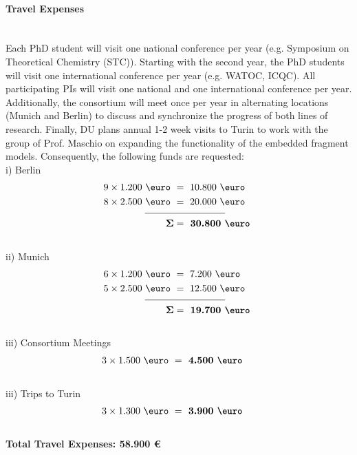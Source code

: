\documentclass[a4paper,11pt,headings=normal]{scrartcl}
\begin{document}
\begin{itemize}
\paragraph{Travel Expenses}\ \\
Each PhD student will visit one national conference per year (e.g. Symposium on 
Theoretical Chemistry (STC)). Starting with the second year, the PhD students 
will visit one international conference per year (e.g. WATOC, ICQC). 
All participating PIs will visit one national and one international conference per year.
Additionally, the consortium will meet once per year in alternating locations 
(Munich and Berlin) to discuss and synchronize the progress of both lines of 
research. Finally, DU plans annual 1-2 week visits to Turin to work with the group of Prof. Maschio on expanding the functionality of the embedded fragment models. Consequently, the following funds are requested:\\
i) Berlin
\begin{align*}
	\text{9} \times \text{1.200 \euro } &= \text{ 10.800 \euro 
	}\\
	\text{8} \times  \text{2.500 \euro } &= \text{ 20.000 \euro 
	}\\[-0.75em]
	\underline{\quad\qquad}&\underline{\qquad \qquad \quad\ }\\
	\mathbf{\Sigma} &= \textbf{ 30.800 \euro }
\end{align*}
\ \\
ii) Munich
\begin{align*}
	\text{6} \times \text{1.200 \euro } &= \text{ 7.200 \euro 
	}\\
	\text{5} \times  \text{2.500 \euro } &= \text{ 12.500 \euro 
	}\\[-0.75em]
	\underline{\quad\qquad}&\underline{\qquad \qquad \quad\ }\\
	\mathbf{\Sigma} &= \textbf{ 19.700 \euro }
\end{align*}
\ \\
iii) Consortium Meetings
\begin{align*}
	\text{3} \times\text{1.500 \euro } &= \textbf{ 4.500 \euro }
\end{align*}
\ \\
iii) Trips to Turin
\begin{align*}
	\text{3} \times \text{1.300 \euro } &= \textbf{ 3.900 \euro }
\end{align*}
\ \\


\textbf{Total Travel Expenses: 58.900 \euro}


\end{itemize}
\end{document}
